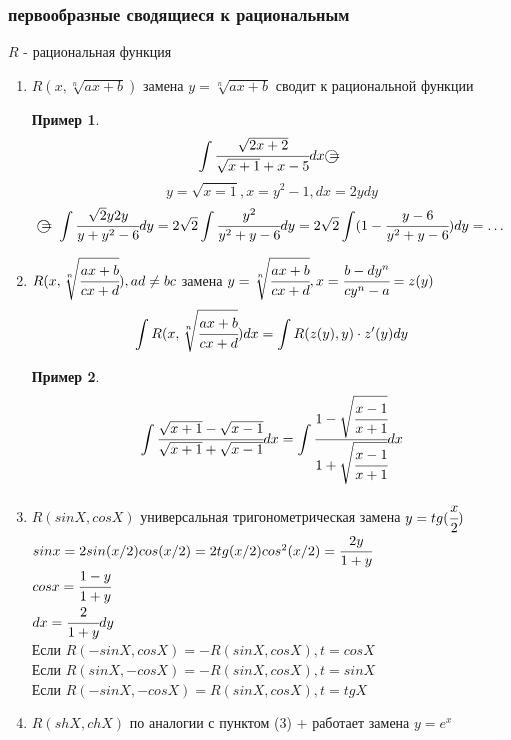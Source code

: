 \documentclass[a4paper]{article}
\theoremstyle{definition}
\newtheorem*{exmp}{Пример}
\newtheorem*{comment}{Замечание}
\numberwithin{theorem}{subsection}
\numberwithin{lemma}{subsection}
\numberwithin{definition}{subsection}
\numberwithin{comment*}{subsection}
\numberwithin{consequence}{subsection}
\numberwithin{property}{subsection}
\begin{document}
\subsubsection{первообразные сводящиеся к рациональным}
$R$ - рациональная функция
\begin{enumerate}
 \item $R(x,\sqrt[n]{ax+b})$ замена $y = \sqrt[n]{ax+b}$ сводит к рациональной функции

       \begin{exmp}
        $$ \int \cfrac{\sqrt{2x+2}}{\sqrt{x+1} + x - 5} dx \text{\textcircled{ = }}$$
        $$ y = \sqrt{x=1}, x = y^2 - 1, dx = 2ydy $$
        $$ \text{\textcircled{ = }} \int \cfrac{\sqrt{2} y 2y}{y + y^2 - 6} dy = 2\sqrt{2} \int \cfrac{y^2}{y^2+y-6} dy  = 2\sqrt{2} \int (1- \cfrac{y-6}{y^2+y-6}) dy = \dots$$
       \end{exmp}
 \item $R(x, \sqrt[n]{\cfrac{ax+b}{cx+d}}), ad \ne bc$ замена $y=\sqrt[n]{\cfrac{ax+b}{cx+d}}, x = \cfrac{b - dy^n}{cy^n-a} = z(y)$
       $$ \int R(x, \sqrt[n]{\cfrac{ax+b}{cx+d}}) dx = \int R(z(y), y)\cdot z'(y) dy$$
       \begin{exmp}
        $$ \int \cfrac{\sqrt{x+1} - \sqrt{x-1}}{\sqrt{x+1} + \sqrt{x-1}} dx = \int \cfrac{1 - \sqrt{\cfrac{x-1}{x+1}}}{1 + \sqrt{\cfrac{x-1}{x+1}}} dx$$
       \end{exmp}
 \item $R(sinX, cosX)$ универсальная тригонометрическая замена $y = tg(\cfrac{x}{2})$
       $sinx = 2 sin(x/2)cos(x/2) = 2 tg(x/2) cos^2(x/2) = \cfrac{2 y}{1+y}$\\
       $cosx= \cfrac{1-y}{1+y}$ \\
       $dx = \cfrac{2}{1+y} dy$ \\
       Если $R(-sinX, cosX) = - R(sinX, cosX), t = cosX$\\
       Если $R(sinX, -cosX) = - R(sinX, cosX), t = sinX$\\
       Если $R(-sinX, -cosX) =  R(sinX, cosX), t = tgX$\\
 \item $R(shX, chX)$ по аналогии с пунктом (3) + работает замена $y = e^x$
\end{enumerate}
\end{document}
